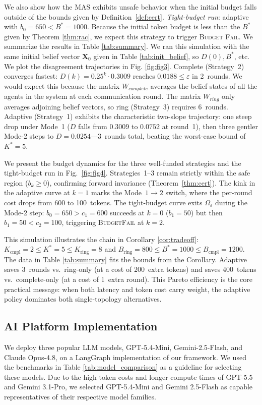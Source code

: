 \documentclass[journal,twoside,web]{ieeecolor_no_firstpage_logo}
\begin{document}
We also show how the MAS exhibits unsafe behavior when the initial budget falls outside of the bounds given by Definition~\ref{def:cert}.
\emph{Tight-budget run}: adaptive with $b_0=650<B^*=1000$. Because the initial token budget is less than the $B^*$ given by Theorem \ref{thm:rac}, we expect this strategy to trigger \textsc{Budget Fail}. We summarize the results in Table \ref{tab:summary}.
We ran this simulation with the same initial belief vector $\mathbf{X}_0$ given in Table \ref{tab:init_belief}, so $D(0), B^*$, etc. 
We plot the disagreement trajectories in Fig. \ref{fig:fig3}.
Complete (Strategy~2) converges fastest: $D(k)=0.25^k\cdot0.3009$
reaches $0.0188\le\varepsilon$ in 2~rounds. We would expect this because the matrix $W_{complete}$ averages the belief states of all the agents in the system at each communication round. The matrix $W_{ring}$ only averages adjoining belief vectors, so ring (Strategy~3) requires 6~rounds.
Adaptive (Strategy~1) exhibits the characteristic two-slope
trajectory: one steep drop under Mode~1 ($D$ falls from $0.3009$ to
$0.0752$ at round~1), then three gentler Mode-2 steps to $D=0.0254$---3~rounds
total, beating the worst-case bound of $K^*=5$.

We present the budget dynamics for the three well-funded strategies and the tight-budget run in Fig.~\ref{fig:fig4}. Strategies~1--3 remain strictly within the safe region ($b_k\ge0$), confirming forward invariance (Theorem~\ref{thm:cert}).
The kink in the adaptive curve at $k=1$ marks the Mode~$1 \to 2$
switch, where the per-round cost drops from 600 to 100~tokens.
The tight-budget curve exits $\Omega_\varepsilon$ during the Mode-2 step:
$b_0=650>c_1=600$ succeeds at $k=0$ ($b_1=50$) but then
$b_1=50<c_2=100$, triggering \textsc{BudgetFail} at $k=2$.

This simulation illustrates the chain in Corollary \ref{cor:tradeoff}:
$K_\text{cmpl}=2\le K^*=5\le K_\text{ring}=8$ and
$B_\text{ring}=800\le B^*=1000\le B_\text{cmpl}=1200$. The data in Table \ref{tab:summary} fits the bounds from the Corollary.
Adaptive saves 3~rounds vs.\ ring-only (at a cost of 200~extra tokens)
and saves 400~tokens vs.\ complete-only (at a cost of 1~extra round).
This Pareto efficiency is the core practical message: when both
latency and token cost carry weight, the adaptive policy dominates both
single-topology alternatives.

\subsection{AI Platform Implementation}
We deploy three popular LLM models, GPT-5.4-Mini, Gemini-2.5-Flash, and Claude Opus-4.8, on a LangGraph implementation of our framework. We used the benchmarks in Table \ref{tab:model_comparison} as a guideline for selecting these models. Due to the high token costs and longer compute times of GPT-5.5 and Gemini 3.1-Pro, we selected GPT-5.4-Mini and Gemini 2.5-Flash as capable representatives of their respective model families.
\end{document}
